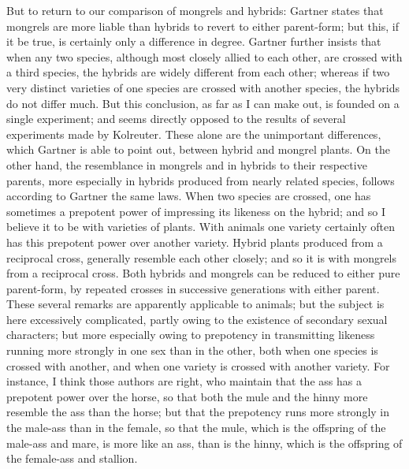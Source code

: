 But to return to our comparison of mongrels and hybrids: Gartner states that mongrels are more liable than hybrids to revert to either parent-form; but this, if it be true, is certainly only a difference in degree. Gartner further insists that when any two species, although most closely allied to each other, are crossed with a third species, the hybrids are widely different from each other; whereas if two very distinct varieties of one species are crossed with another species, the hybrids do not differ much. But this conclusion, as far as I can make out, is founded on a single experiment; and seems directly opposed to the results of several experiments made by Kolreuter.
These alone are the unimportant differences, which Gartner is able to point out, between hybrid and mongrel plants. On the other hand, the resemblance in mongrels and in hybrids to their respective parents, more especially in hybrids produced from nearly related species, follows according to Gartner the same laws. When two species are crossed, one has sometimes a prepotent power of impressing its likeness on the hybrid; and so I believe it to be with varieties of plants. With animals one variety certainly often has this prepotent power over another variety. Hybrid plants produced from a reciprocal cross, generally resemble each other closely; and so it is with mongrels from a reciprocal cross. Both hybrids and mongrels can be reduced to either pure parent-form, by repeated crosses in successive generations with either parent.
These several remarks are apparently applicable to animals; but the subject is here excessively complicated, partly owing to the existence of secondary sexual characters; but more especially owing to prepotency in transmitting likeness running more strongly in one sex than in the other, both when one species is crossed with another, and when one variety is crossed with another variety. For instance, I think those authors are right, who maintain that the ass has a prepotent power over the horse, so that both the mule and the hinny more resemble the ass than the horse; but that the prepotency runs more strongly in the male-ass than in the female, so that the mule, which is the offspring of the male-ass and mare, is more like an ass, than is the hinny, which is the offspring of the female-ass and stallion.
